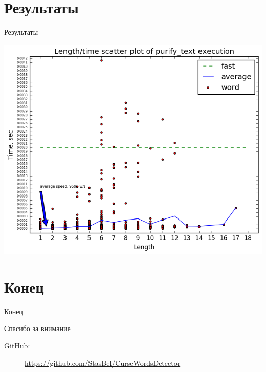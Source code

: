 \documentclass{beamer}
\begin{document}
\section{Результаты}
\begin{frame}[t]{Результаты}
    \begin{center}
        \includegraphics[width=0.74\linewidth]{../src/test/resources/plots/length_time_plot.png}
    \end{center}
\end{frame}

\section{Конец}
\begin{frame}[t]{Конец}
    \begin{center}
    Спасибо за внимание
    \end{center}
	\begin{description}
		\item[GitHub:]  \url{https://github.com/StasBel/CurseWordsDetector}
	\end{description}
\end{frame}
\end{document}
